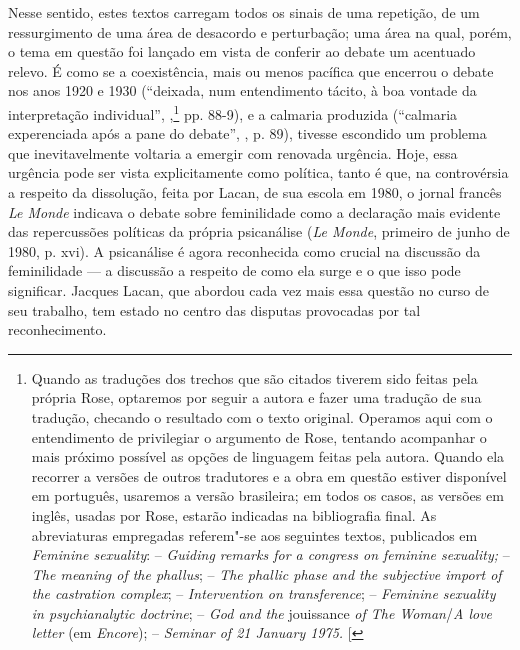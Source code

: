 Nesse sentido, estes textos carregam todos os sinais de uma repetição,
de um ressurgimento de uma área de desacordo e perturbação; uma área na
qual, porém, o tema em questão foi lançado em vista de conferir ao
debate um acentuado relevo. É como se a coexistência, mais ou menos
pacífica que encerrou o debate nos anos 1920 e 1930 (``deixada, num
entendimento tácito, à boa vontade da interpretação individual'',
,\footnote{Quando as traduções dos trechos que são citados tiverem sido
  feitas pela própria Rose, optaremos por seguir a autora e fazer uma
  tradução de sua tradução, checando o resultado com o texto original.
  Operamos aqui com o entendimento de privilegiar o argumento de Rose,
  tentando acompanhar o mais próximo possível as opções de linguagem
  feitas pela autora. Quando ela recorrer a versões de outros tradutores
  e a obra em questão estiver disponível em português, usaremos a versão
  brasileira; em todos os casos, as versões em inglês, usadas por Rose,
  estarão indicadas na bibliografia final. As abreviaturas empregadas
  referem"-se aos seguintes textos, publicados em \emph{Feminine
  sexuality}:  -- \emph{Guiding remarks for a congress on feminine
  sexuality;}  -- \emph{The meaning of the phallus};  -- \emph{The
  phallic phase and the subjective import of the castration complex};
   -- \emph{Intervention on transference};  -- \emph{Feminine
  sexuality in psychianalytic doctrine};  -- \emph{God and the}
  jouissance \emph{of The Woman}/\emph{A love letter} (em
  \emph{Encore});  -- \emph{Seminar of 21 January 1975.} {[}\versal{N.~T.}{]}}
pp. 88-9), e a calmaria produzida (``calmaria experenciada após a pane
do debate'', , p. 89), tivesse escondido um problema que
inevitavelmente voltaria a emergir com renovada urgência. Hoje, essa
urgência pode ser vista explicitamente como política, tanto é que, na
controvérsia a respeito da dissolução, feita por Lacan, de sua escola em
1980, o jornal francês \emph{Le Monde} indicava o debate sobre
feminilidade como a declaração mais evidente das repercussões políticas
da própria psicanálise (\emph{Le Monde}, primeiro de junho de 1980, p.
xvi). A psicanálise é agora reconhecida como crucial na discussão da
feminilidade --- a discussão a respeito de como ela surge e o que isso
pode significar. Jacques Lacan, que abordou cada vez mais essa questão
no curso de seu trabalho, tem estado no centro das disputas provocadas
por tal reconhecimento.

